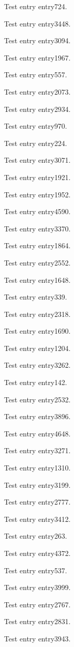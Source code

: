 Test entry \gls{entry724}.

Test entry \gls{entry3448}.

Test entry \gls{entry3094}.

Test entry \gls{entry1967}.

Test entry \gls{entry557}.

Test entry \gls{entry2073}.

Test entry \gls{entry2934}.

Test entry \gls{entry970}.

Test entry \gls{entry224}.

Test entry \gls{entry3071}.

Test entry \gls{entry1921}.

Test entry \gls{entry1952}.

Test entry \gls{entry4590}.

Test entry \gls{entry3370}.

Test entry \gls{entry1864}.

Test entry \gls{entry2552}.

Test entry \gls{entry1648}.

Test entry \gls{entry339}.

Test entry \gls{entry2318}.

Test entry \gls{entry1690}.

Test entry \gls{entry1204}.

Test entry \gls{entry3262}.

Test entry \gls{entry142}.

Test entry \gls{entry2532}.

Test entry \gls{entry3896}.

Test entry \gls{entry4648}.

Test entry \gls{entry3271}.

Test entry \gls{entry1310}.

Test entry \gls{entry3199}.

Test entry \gls{entry2777}.

Test entry \gls{entry3412}.

Test entry \gls{entry263}.

Test entry \gls{entry4372}.

Test entry \gls{entry537}.

Test entry \gls{entry3999}.

Test entry \gls{entry2767}.

Test entry \gls{entry2831}.

Test entry \gls{entry3943}.

